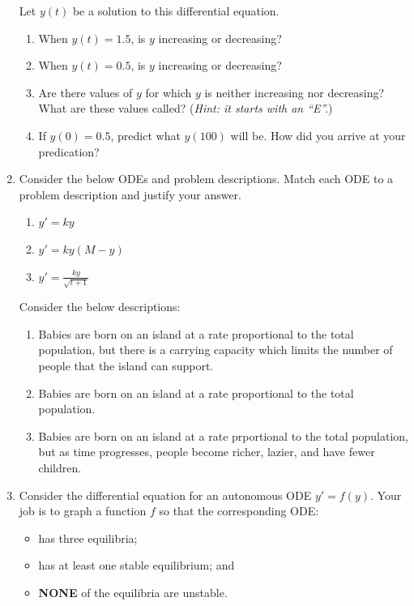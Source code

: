 \begin{enumerate}
    Let $y(t)$ be a solution to this differential equation.

    \begin{enumerate}
        \item When $y(t)=1.5$, is $y$ increasing or decreasing? 
        \item When $y(t)=0.5$, is $y$ increasing or decreasing?
        \item Are there values of $y$ for which $y$ is neither increasing nor decreasing? What are these values called? (\emph{Hint: it starts with an ``E''.})
        \item If $y(0)=0.5$, predict what $y(100)$ will be. How did you arrive at your predication?
    \end{enumerate}

    \item Consider the below ODEs and problem descriptions. Match each ODE to a problem description and justify your answer.
    \begin{tcolorbox}[sharp corners=all,colframe=tolGrey,colback=white]
        \begin{multicols}{2}
        \begin{enumerate}[label={(\roman{enumii})},nosep,itemsep=1mm]
            \item $y'=ky$
            \item $y'=ky(M-y)$
            \item $y'=\frac{ky}{\sqrt{t+1}}$
        \end{enumerate}
        \end{multicols}
    \end{tcolorbox}

    Consider the below descriptions:
    \begin{enumerate}
        \item Babies are born on an island at a rate proportional to the total population, but there is a carrying capacity which limits the number of people that the island can support.
        \item Babies are born on an island at a rate proportional to the total population.
        \item Babies are born on an island at a rate prportional to the total population, but as time progresses, people become richer, lazier, and have fewer children.
    \end{enumerate}



    \item Consider the differential equation for an autonomous ODE $y'=f(y)$.
    Your job is to graph a function $f$ so that the corresponding ODE:
    \begin{itemize}[nosep]
        \item has three equilibria;
        \item has at least one stable equilibrium; and
        \item \textbf{NONE} of the equilibria are unstable.
    \end{itemize}


\end{enumerate}
